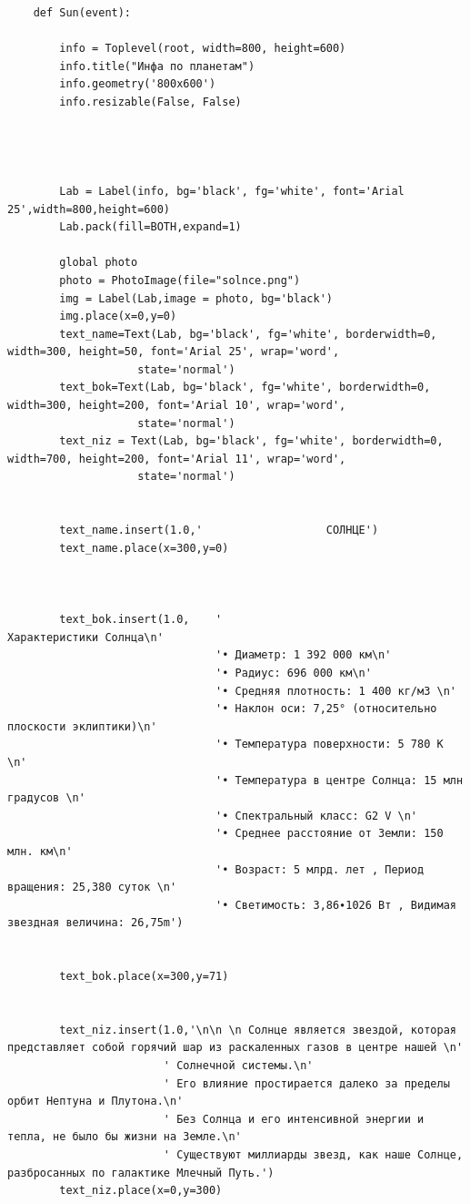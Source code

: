 \documentclass[11pt,a4paper]{report}
\begin{document}
\begin{verbatim}
    def Sun(event):
        
        info = Toplevel(root, width=800, height=600)
        info.title("Инфа по планетам")
        info.geometry('800x600')
        info.resizable(False, False)  
        
        
        
    
        Lab = Label(info, bg='black', fg='white', font='Arial 25',width=800,height=600)  
        Lab.pack(fill=BOTH,expand=1)
        
        global photo
        photo = PhotoImage(file="solnce.png")
        img = Label(Lab,image = photo, bg='black')
        img.place(x=0,y=0)
        text_name=Text(Lab, bg='black', fg='white', borderwidth=0, width=300, height=50, font='Arial 25', wrap='word',
                    state='normal')  
        text_bok=Text(Lab, bg='black', fg='white', borderwidth=0, width=300, height=200, font='Arial 10', wrap='word',
                    state='normal')  
        text_niz = Text(Lab, bg='black', fg='white', borderwidth=0, width=700, height=200, font='Arial 11', wrap='word',
                    state='normal')  
    
       
        text_name.insert(1.0,'                   СОЛНЦЕ')
        text_name.place(x=300,y=0)
        
        
        
        text_bok.insert(1.0,    '                                           Характеристики Солнца\n' 
                                '• Диаметр: 1 392 000 км\n' 
                                '• Радиус: 696 000 км\n' 
                                '• Средняя плотность: 1 400 кг/м3 \n'
                                '• Наклон оси: 7,25° (относительно плоскости эклиптики)\n' 
                                '• Температура поверхности: 5 780 К \n'
                                '• Температура в центре Солнца: 15 млн градусов \n'
                                '• Спектральный класс: G2 V \n'
                                '• Среднее расстояние от Земли: 150 млн. км\n' 
                                '• Возраст: 5 млрд. лет , Период вращения: 25,380 суток \n'
                                '• Светимость: 3,86∙1026 Вт , Видимая звездная величина: 26,75m')
        
        
        text_bok.place(x=300,y=71)        
        
        
        text_niz.insert(1.0,'\n\n \n Солнце является звездой, которая представляет собой горячий шар из раскаленных газов в центре нашей \n'
                        ' Солнечной системы.\n' 
                        ' Его влияние простирается далеко за пределы орбит Нептуна и Плутона.\n' 
                        ' Без Солнца и его интенсивной энергии и тепла, не было бы жизни на Земле.\n'
                        ' Существуют миллиарды звезд, как наше Солнце, разбросанных по галактике Млечный Путь.')
        text_niz.place(x=0,y=300)
        

\end{verbatim}
\end{document}
